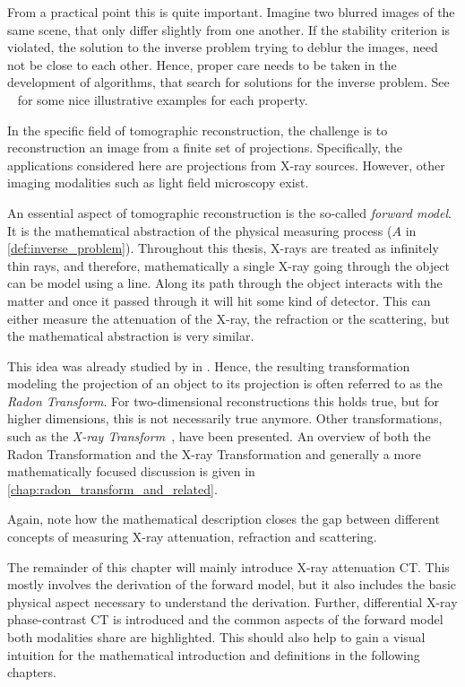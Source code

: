 From a practical point this is quite important. Imagine two blurred images of the same scene, that
only differ slightly from one another. If the stability criterion is violated, the solution to the
inverse problem trying to deblur the images, need not be close to each other. Hence, proper care
needs to be taken in the development of algorithms, that search for solutions for the inverse
problem. See \citeauthor{hansen_discrete_2010}~\cite{hansen_discrete_2010} for some nice
illustrative examples for each property.

In the specific field of tomographic reconstruction, the challenge is to reconstruction an image
from a finite set of projections. Specifically, the applications considered here are projections
from X-ray sources. However, other imaging modalities such as light field microscopy exist.

An essential aspect of tomographic reconstruction is the so-called \textit{forward model}. It is the
mathematical abstraction of the physical measuring process (\(A\) in \autoref{def:inverse_problem}).
Throughout this thesis, X-rays are treated as infinitely thin rays, and therefore, mathematically a
single X-ray going through the object can be model using a line. Along its path through the object
interacts with the matter and once it passed through it will hit some kind of detector. This can
either measure the attenuation of the X-ray, the refraction or the scattering, but the mathematical
abstraction is very similar.

This idea was already studied by \citeauthor{radon_uber_1917} in \citeyear{radon_uber_1917}. Hence,
the resulting transformation modeling the projection of an object to its projection is often
referred to as the \textit{Radon Transform}. For two-dimensional reconstructions this holds true,
but for higher dimensions, this is not necessarily true anymore. Other transformations, such as the
\textit{X-ray Transform}~\cite{solmon_x-ray_1976}, have been presented. An overview of both the
Radon Transformation and the X-ray Transformation and generally a more mathematically focused
discussion is given in \autoref{chap:radon_transform_and_related}.

Again, note how the mathematical description closes the gap between different concepts of
measuring X-ray attenuation, refraction and scattering.

The remainder of this chapter will mainly introduce X-ray attenuation CT\@. This mostly involves the
derivation of the forward model, but it also includes the basic physical aspect necessary to
understand the derivation. Further, differential X-ray phase-contrast CT is introduced and the
common aspects of the forward model both modalities share are highlighted. This should also help to
gain a visual intuition for the mathematical introduction and definitions in the following chapters.

